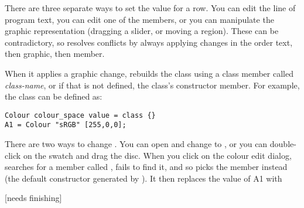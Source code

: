 There are three separate ways to set the value for a row. You can
edit the line of program text, you can edit one of the members, or you can
manipulate the graphic representation (dragging a slider, or moving a region).
These can be contradictory, so \nip{} resolves conflicts by always applying
changes in the order text, then graphic, then member. 

When it applies a graphic change, \nip{} rebuilds the class using a class 
member called \emph{class-name}, or if that is not defined, the
class's constructor member. For example, the  class can be defined
as:

\begin{verbatim}
Colour colour_space value = class {}
A1 = Colour "sRGB" [255,0,0];
\end{verbatim}

\noindent
There are two ways to change . You can open  and change
 to , or you can double-click on the swatch
and drag the disc. When you click  on the colour edit dialog, \nip{}
searches for a member called , fails to find it, and so
picks the  member instead (the default constructor generated by
\nip{}). It then replaces the value of A1 with

[needs finishing]

